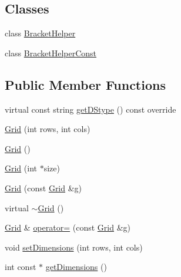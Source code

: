 \subsection*{Classes}
\begin{DoxyCompactItemize}
\item 
class \mbox{\hyperlink{classbridges_1_1datastructure_1_1_grid_1_1_bracket_helper}{Bracket\+Helper}}
\item 
class \mbox{\hyperlink{classbridges_1_1datastructure_1_1_grid_1_1_bracket_helper_const}{Bracket\+Helper\+Const}}
\end{DoxyCompactItemize}
\subsection*{Public Member Functions}
\begin{DoxyCompactItemize}
\item 
virtual const string \mbox{\hyperlink{classbridges_1_1datastructure_1_1_grid_a16aeae38446b96f440dea15f2b19334d}{get\+D\+Stype}} () const override
\item 
\mbox{\hyperlink{classbridges_1_1datastructure_1_1_grid_a80d8bca9d3793d896a92168a54ce7b2b}{Grid}} (int rows, int cols)
\item 
\mbox{\hyperlink{classbridges_1_1datastructure_1_1_grid_a41c8c94cd9a22ccf978c5e2b1141c813}{Grid}} ()
\item 
\mbox{\hyperlink{classbridges_1_1datastructure_1_1_grid_ad47ddbed7bbd07f98aaa61b74fcf826c}{Grid}} (int $\ast$size)
\item 
\mbox{\hyperlink{classbridges_1_1datastructure_1_1_grid_afc81003993a30d1112d2dff71bfc191b}{Grid}} (const \mbox{\hyperlink{classbridges_1_1datastructure_1_1_grid}{Grid}} \&g)
\item 
virtual \mbox{\hyperlink{classbridges_1_1datastructure_1_1_grid_aa04b4929a35fa359dbaab86e46fda204}{$\sim$\+Grid}} ()
\item 
\mbox{\hyperlink{classbridges_1_1datastructure_1_1_grid}{Grid}} \& \mbox{\hyperlink{classbridges_1_1datastructure_1_1_grid_a3522d8c94ad390ebafb12257a6c9b82f}{operator=}} (const \mbox{\hyperlink{classbridges_1_1datastructure_1_1_grid}{Grid}} \&g)
\item 
void \mbox{\hyperlink{classbridges_1_1datastructure_1_1_grid_a234818a9e22b6cefe943210c088c2a76}{set\+Dimensions}} (int rows, int cols)
\item 
int const  $\ast$ \mbox{\hyperlink{classbridges_1_1datastructure_1_1_grid_a5f1427f96782b3667585c06caef0b533}{get\+Dimensions}} ()
\item 

\end{DoxyCompactItemize}
